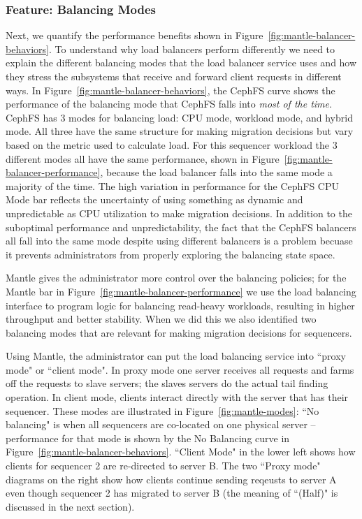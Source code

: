 \documentclass[preprint]{sigplanconf-eurosys}
\begin{document}
\subsubsection{Feature: Balancing Modes}
\label{sec:feature-balancing-modes}

Next, we quantify the performance benefits shown in
Figure~\ref{fig:mantle-balancer-behaviors}.  To understand why load balancers
perform differently we need to explain the different balancing modes that the
load balancer service uses and how they stress the subsystems that receive and
forward client requests in different ways. In
Figure~\ref{fig:mantle-balancer-behaviors}, the CephFS curve shows the
performance of the balancing mode that CephFS falls into {\it most of the time}.
CephFS has 3 modes for balancing load: CPU mode, workload mode, and hybrid
mode. All three have the same structure for making migration decisions but vary
based on the metric used to calculate load. For this sequencer workload the 3
different modes all have the same performance, shown in
Figure~\ref{fig:mantle-balancer-performance}, because the load balancer falls
into the same mode a majority of the time.  The high variation in performance
for the CephFS CPU Mode bar reflects the uncertainty of using something as
dynamic and unpredictable as CPU utilization to make migration decisions. In
addition to the suboptimal performance and unpredictability, the fact that the
CephFS balancers all fall into the same mode despite using different balancers
is a problem becuase it prevents administrators from properly exploring the
balancing state space.

Mantle gives the administrator more control over the balancing policies; for
the Mantle bar in Figure~\ref{fig:mantle-balancer-performance} we use the load
balancing interface to program logic for balancing read-heavy workloads,
resulting in higher throughput and better stability.  When we did this we also
identified two balancing modes that are relevant for making migration decisions
for sequencers. 

Using Mantle, the administrator can put the load balancing service into ``proxy
mode" or ``client mode". In proxy mode one server receives all requests and
farms off the requests to slave servers; the slaves servers do the actual tail
finding operation. In client mode, clients interact directly with the server
that has their sequencer.  These modes are illustrated in
Figure~\ref{fig:mantle-modes}: ``No balancing" is when all sequencers are
co-located on one physical server -- performance for that mode is shown by the
No Balancing curve in Figure~\ref{fig:mantle-balancer-behaviors}.  ``Client
Mode" in the lower left shows how clients for sequencer 2 are re-directed to
server B. The two ``Proxy mode" diagrams on the right show how clients continue
sending reqeusts to server A even though sequencer 2 has migrated to server B
(the meaning of ``(Half)" is discussed in the next section).
\end{document}
